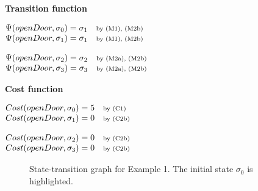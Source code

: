 \documentclass[11pt]{article}
\makeatletter
\newcommand{\exampleblocktitle}[1]{\par\medskip\noindent\textbf{#1}\par\smallskip}
\newcommand{\byrule}[1]{\quad \text{\scriptsize by #1}}
\newenvironment{statementblock}
{\begin{flushleft}\renewcommand{\arraystretch}{1.1}\(\begin{array}{@{}l@{}}}
{\end{array}\)\end{flushleft}}
\makeatother
\begin{document}
\exampleblocktitle{Transition function}
\noindent
\begin{minipage}[t]{0.47\textwidth}
\begin{statementblock}
\Psi(openDoor, \sigma_0) = \sigma_1 \byrule{(M1), (M2b)} \\
\Psi(openDoor, \sigma_1) = \sigma_1 \byrule{(M1), (M2b)}
\end{statementblock}
\end{minipage}
\hfill
\begin{minipage}[t]{0.47\textwidth}
\begin{statementblock}
\Psi(openDoor, \sigma_2) = \sigma_2 \byrule{(M2a), (M2b)} \\
\Psi(openDoor, \sigma_3) = \sigma_3 \byrule{(M2a), (M2b)}
\end{statementblock}
\end{minipage}

\exampleblocktitle{Cost function}
\noindent
\begin{minipage}[t]{0.47\textwidth}
\begin{statementblock}
Cost(openDoor, \sigma_0) = 5 \byrule{(C1)} \\
Cost(openDoor, \sigma_1) = 0 \byrule{(C2b)}
\end{statementblock}
\end{minipage}
\hfill
\begin{minipage}[t]{0.47\textwidth}
\begin{statementblock}
Cost(openDoor, \sigma_2) = 0 \byrule{(C2b)} \\
Cost(openDoor, \sigma_3) = 0 \byrule{(C2b)}
\end{statementblock}
\end{minipage}

\begin{figure}[H]
\centering
\setlength{\fboxsep}{8pt}
\caption{State-transition graph for Example 1. The initial state \(\sigma_0\) is highlighted.}
\end{figure}
\end{document}
